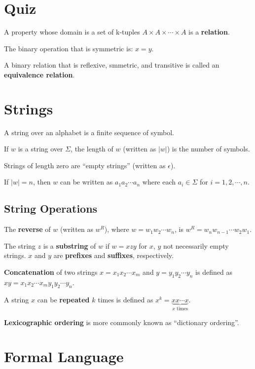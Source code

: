 \documentclass{article}
\begin{document}
\section*{Quiz}

A property whose domain is a set of k-tuples
$A\times{}A\times\cdots\times{}A$ is a \textbf{relation}.

The binary operation that is symmetric is: $x=y$.

A binary relation that is reflexive, smmetric, and transitive is
called an \textbf{equivalence relation}.

\section*{Strings}

A string over an alphabet is a finite sequence of symbol.

If $w$ is a string over $\Sigma$, the length of $w$ (written as $|w|$)
is the number of symbols.

Strings of length zero are ``empty strings'' (written as $\epsilon$).

If $|w|=n$, then $w$ can be written as $a_1a_2\cdots{}a_n$ where each
$a_i\in\Sigma$ for $i=1,2,\cdots,n$.

\subsection*{String Operations}

The \textbf{reverse} of $w$ (written as $w^R$), where
$w=w_1w_2\cdots{}w_n$, is $w^R=w_nw_{n-1}\cdots{}w_2w_1$.

The string $z$ is a \textbf{substring} of $w$ if $w=xzy$ for $x$, $y$
not necessarily empty strings. $x$ and $y$ are \textbf{prefixes} and
\textbf{suffixes}, respectively.

\textbf{Concatenation} of two strings $x=x_1x_2\cdots{}x_m$ and
$y=y_1y_2\cdots{}y_n$ is defined as
$xy=x_1x_2\cdots{}x_my_1y_2\cdots{}y_n$.

A string $x$ can be \textbf{repeated} $k$ times is defined as
$x^k=\underbrace{xx\cdots{}x}_{\text{$x$ times}}$.

\textbf{Lexicographic ordering} is more commonly known as ``dictionary
ordering''.

\section*{Formal Language}
\end{document}
